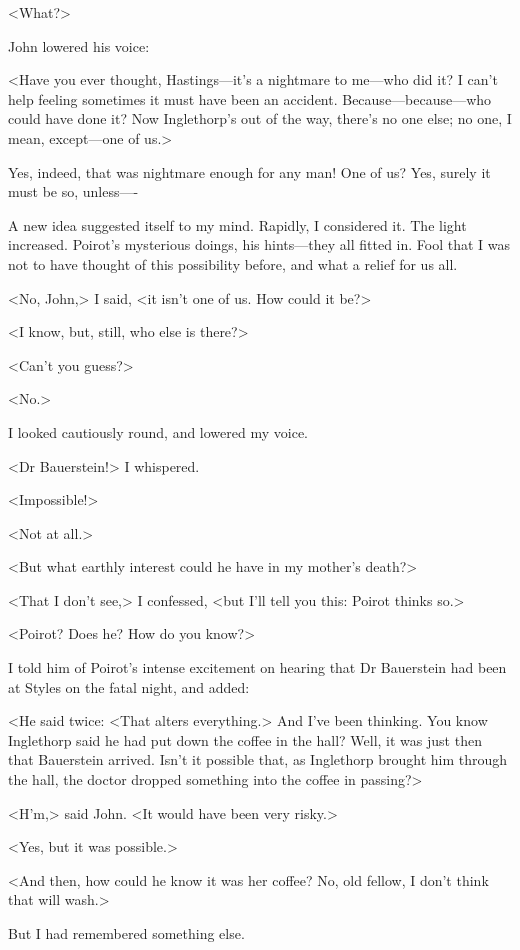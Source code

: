  <What?> 

 John lowered his voice: 

 <Have you ever thought, Hastings—it's a nightmare to me—who did it? I can't help feeling sometimes it must have been an accident. Because—because—who could have done it? Now Inglethorp's out of the way, there's no one else; no one, I mean, except—one of us.> 

 Yes, indeed, that was nightmare enough for any man! One of us? Yes, surely it must be so, unless—- 

 A new idea suggested itself to my mind. Rapidly, I considered it. The light increased. Poirot's mysterious doings, his hints—they all fitted in. Fool that I was not to have thought of this possibility before, and what a relief for us all. 

 <No, John,> I said, <it isn't one of us. How could it be?> 

 <I know, but, still, who else is there?> 

 <Can't you guess?> 

 <No.> 

 I looked cautiously round, and lowered my voice. 

 <Dr Bauerstein!> I whispered. 

 <Impossible!> 

 <Not at all.> 

 <But what earthly interest could he have in my mother's death?> 

 <That I don't see,> I confessed, <but I'll tell you this: Poirot thinks so.> 

 <Poirot? Does he? How do you know?> 

 I told him of Poirot's intense excitement on hearing that Dr Bauerstein had been at Styles on the fatal night, and added: 

 <He said twice: <That alters everything.> And I've been thinking. You know Inglethorp said he had put down the coffee in the hall? Well, it was just then that Bauerstein arrived. Isn't it possible that, as Inglethorp brought him through the hall, the doctor dropped something into the coffee in passing?> 

 <H'm,> said John. <It would have been very risky.> 

 <Yes, but it was possible.> 

 <And then, how could he know it was her coffee? No, old fellow, I don't think that will wash.> 

 But I had remembered something else. 

